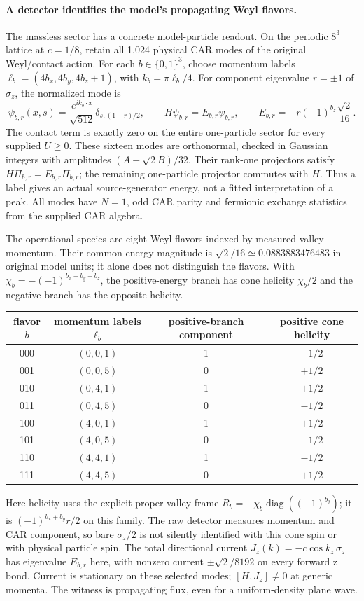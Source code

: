 \paragraph{A detector identifies the model's propagating Weyl flavors.}
The massless sector has a concrete model-particle readout.  On the
periodic $8^3$ lattice at $c=1/8$, retain all 1,024 physical CAR modes of
the original Weyl/contact action.  For each $b\in\{0,1\}^3$, choose
momentum labels $\ell_b=(4b_x,4b_y,4b_z+1)$, with $k_b=\pi\ell_b/4$.
For component eigenvalue $r=\pm1$ of $\sigma_z$, the normalized mode is
\[
 \psi_{b,r}(x,s)=\frac{e^{ik_b\cdot x}}{\sqrt{512}}
                 \delta_{s,(1-r)/2},\qquad
 H\psi_{b,r}=E_{b,r}\psi_{b,r},\qquad
 E_{b,r}=-r(-1)^{b_z}\frac{\sqrt2}{16}.
\]
The contact term is exactly zero on the entire one-particle sector for
every supplied $U\ge0$.  These sixteen modes are orthonormal, checked
in Gaussian integers with amplitudes $(A+\sqrt2 B)/32$.
Their rank-one projectors satisfy $H\Pi_{b,r}=E_{b,r}\Pi_{b,r}$;
the remaining one-particle projector commutes with $H$.
Thus a label gives an actual source-generator energy, not a fitted
interpretation of a peak.  All modes have $N=1$, odd CAR parity and
fermionic exchange statistics from the supplied CAR algebra.

The operational species are eight Weyl flavors indexed by measured
valley momentum.  Their common energy magnitude is
$\sqrt2/16\simeq0.0883883476483$ in original model units; it alone does
not distinguish the flavors.  With
$\chi_b=-(-1)^{b_x+b_y+b_z}$, the positive-energy branch has cone helicity
$\chi_b/2$ and the negative branch has the opposite helicity.
\begin{center}
\begin{tabular}{c c c c}
flavor $b$ & momentum labels $\ell_b$ & positive-branch component
          & positive cone helicity\\\hline
000 & $(0,0,1)$ & 1 & $-1/2$\\
001 & $(0,0,5)$ & 0 & $+1/2$\\
010 & $(0,4,1)$ & 1 & $+1/2$\\
011 & $(0,4,5)$ & 0 & $-1/2$\\
100 & $(4,0,1)$ & 1 & $+1/2$\\
101 & $(4,0,5)$ & 0 & $-1/2$\\
110 & $(4,4,1)$ & 1 & $-1/2$\\
111 & $(4,4,5)$ & 0 & $+1/2$
\end{tabular}
\end{center}
Here helicity uses the explicit proper valley frame
$R_b=-\chi_b\operatorname{diag}((-1)^{b_j})$; it is
$(-1)^{b_x+b_y}r/2$ on this family.  The raw detector measures momentum
and CAR component, so bare $\sigma_z/2$ is not silently identified with
this cone spin or with physical particle spin.  The total directional
current $J_z(k)=-c\cos k_z\,\sigma_z$ has eigenvalue $E_{b,r}$ here,
with nonzero current $\pm\sqrt2/8192$ on every forward z bond.
Current is stationary on these selected modes; $[H,J_z]\ne0$ at generic
momenta.  The witness is propagating flux, even for a uniform-density
plane wave.

